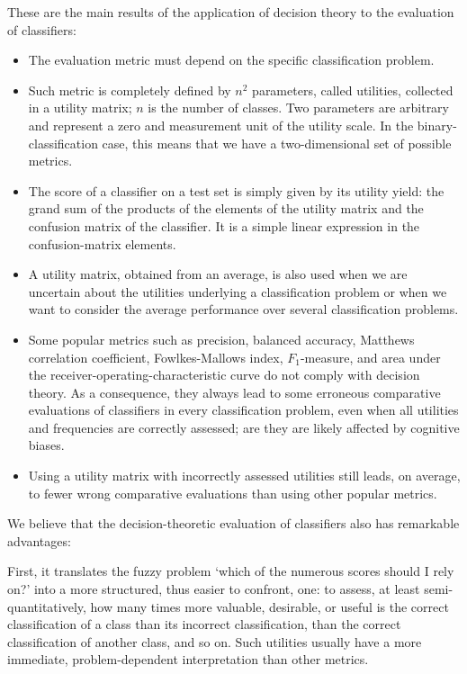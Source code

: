 \documentclass[\ifafour a4paper,12pt,\else a5paper,10pt,\fi%
onecolumn,oneside,article,%
british%
]{memoir}
\theoremstyle{remark}
\theoremstyle{innote}
\renewcommand*{\|}[1][]{\nonscript\:#1\vert\nonscript\:\mathopen{}}
\begin{document}
These are the main results of the application of decision theory to the evaluation of classifiers:
\begin{itemize}[wide]
\item The evaluation metric must depend on the specific classification problem.
\item Such metric is completely defined by $n^{2}$ parameters, called utilities, collected in a utility matrix; $n$ is the number of classes. Two parameters are arbitrary and represent a zero and measurement unit of the utility scale. In the binary-classification case, this means that we have a two-dimensional set of possible metrics.
\item The score of a classifier on a test set is simply given by its utility yield: the grand sum of the products of the elements of the utility matrix and the confusion matrix of the classifier. It is a simple linear expression in the confusion-matrix elements.
\item A utility matrix, obtained from an average, is also used when we are uncertain about the utilities underlying a classification problem or when we want to consider the average performance over several classification problems.
\item Some popular metrics such as precision, balanced accuracy, Matthews correlation coefficient, Fowlkes-Mallows index, $F_{1}$-measure, and area under the receiver-operating-characteristic curve do not comply with decision theory. As a consequence, they always lead to some erroneous comparative evaluations of classifiers in every classification problem, even when all utilities and frequencies are correctly assessed; are they are likely affected by cognitive biases.
\item Using a utility matrix with incorrectly assessed utilities still leads, on average, to fewer wrong comparative evaluations than using other popular metrics.
\end{itemize}

We believe that the decision-theoretic evaluation of classifiers also has remarkable advantages:

First, it translates the fuzzy problem \enquote*{which of the numerous scores should I rely on?} into a more structured, thus easier to confront, one: to assess, at least semi-quantitatively, how many times more valuable, desirable, or useful is the correct classification of a class than its incorrect classification, than the correct classification of another class, and so on. Such utilities usually have a more immediate, problem-dependent interpretation than other metrics.
\end{document}
